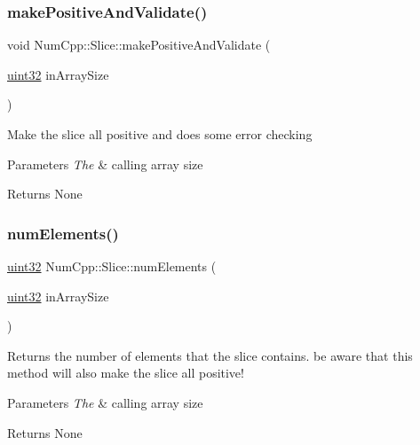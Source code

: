 \subsubsection{\texorpdfstring{make\+Positive\+And\+Validate()}{makePositiveAndValidate()}}
{\footnotesize\ttfamily void Num\+Cpp\+::\+Slice\+::make\+Positive\+And\+Validate (\begin{DoxyParamCaption}\item[{\mbox{\hyperlink{namespace_num_cpp_a36f388e948380413c63011cab9b7fbd5}{uint32}}}]{in\+Array\+Size }\end{DoxyParamCaption})\hspace{0.3cm}{\ttfamily [inline]}}

Make the slice all positive and does some error checking


\begin{DoxyParams}{Parameters}
{\em The} & calling array size\\
\hline
\end{DoxyParams}
\begin{DoxyReturn}{Returns}
None 
\end{DoxyReturn}
\mbox{\label{class_num_cpp_1_1_slice_af3ee8316724829adde628338c0b226ee}} 
\subsubsection{\texorpdfstring{num\+Elements()}{numElements()}}
{\footnotesize\ttfamily \mbox{\hyperlink{namespace_num_cpp_a36f388e948380413c63011cab9b7fbd5}{uint32}} Num\+Cpp\+::\+Slice\+::num\+Elements (\begin{DoxyParamCaption}\item[{\mbox{\hyperlink{namespace_num_cpp_a36f388e948380413c63011cab9b7fbd5}{uint32}}}]{in\+Array\+Size }\end{DoxyParamCaption})\hspace{0.3cm}{\ttfamily [inline]}}

Returns the number of elements that the slice contains. be aware that this method will also make the slice all positive!


\begin{DoxyParams}{Parameters}
{\em The} & calling array size\\
\hline
\end{DoxyParams}
\begin{DoxyReturn}{Returns}
None 
\end{DoxyReturn}
\mbox{\label{class_num_cpp_1_1_slice_adb10794ccc51c541a007403455073621}} 
